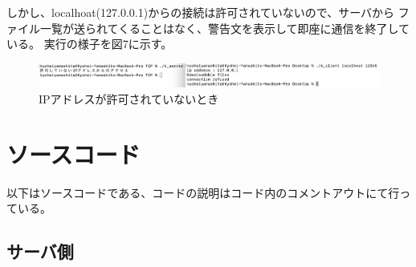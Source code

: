 \documentclass[dvipdfmx,autodetect-engine,titlepage]{jsarticle}
\begin{document}
しかし、localhoat(127.0.0.1)からの接続は許可されていないので、サーバから
ファイル一覧が送られてくることはなく、警告文を表示して即座に通信を終了している。
実行の様子を図7に示す。\\

\begin{figure}[h]
    \centering
    \includegraphics[scale=0.5]{pic6.png}
    \caption{IPアドレスが許可されていないとき}
\end{figure}

\section{ソースコード}
以下はソースコードである、コードの説明はコード内のコメントアウトにて行っている。
\subsection{サーバ側}
\end{document}
